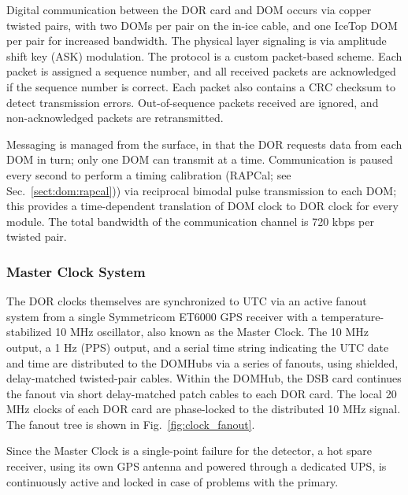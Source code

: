 Digital communication between the DOR card and DOM occurs via copper
twisted pairs, with two DOMs per pair on the in-ice cable, and one IceTop
DOM per pair for increased bandwidth.  The physical layer signaling is via
amplitude shift key (ASK) modulation.  The protocol is a custom
packet-based scheme.  Each packet is assigned a sequence number, and all
received packets are acknowledged if the sequence number is correct.  Each
packet also contains a CRC checksum to detect transmission errors.
Out-of-sequence packets received are ignored, and non-acknowledged packets
are retransmitted.

Messaging is managed from the surface, in that the DOR requests data from
each DOM in turn; only one DOM can transmit at a time.  Communication is
paused every second to perform a timing calibration (RAPCal; see
Sec.~\ref{sect:dom:rapcal})) via reciprocal bimodal pulse transmission to
each DOM; this provides a time-dependent translation of DOM clock to DOR
clock for every module.  The total bandwidth of the communication channel
is 720 kbps per twisted pair.


\subsubsection{\label{sect:online:master_clock}Master Clock System}

The DOR clocks themselves are synchronized to UTC via an active fanout
system from a single Symmetricom ET6000 GPS receiver with a
temperature-stabilized 10 MHz oscillator, also known as the Master Clock.
The 10 MHz output, a 1 Hz (PPS) output, and a serial time string indicating
the UTC date and time are distributed to the DOMHubs via a series of
fanouts, using shielded, delay-matched twisted-pair cables.  Within the
DOMHub, the DSB card continues the fanout via short delay-matched patch
cables to each DOR card.  The local 20 MHz clocks of each DOR card are
phase-locked to the distributed 10 MHz signal.  The fanout tree is shown in
Fig.~\ref{fig:clock_fanout}.

Since the Master Clock is a single-point failure for the detector, a
hot spare receiver, using its own GPS antenna and powered through a
dedicated UPS, is continuously active and locked in case of problems with
the primary.

